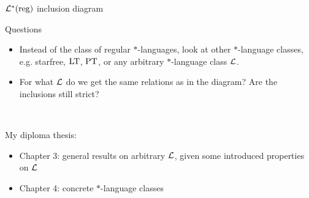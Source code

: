 \documentclass[
	notheorems,noamsthm]{beamer}
\begin{document}
\begin{frame}{$\mathcal{L}^*(\textup{\textrm{reg}})$ inclusion diagram}
\begin{center}
\end{center}
\end{frame}

\begin{frame}[<+->]{Questions}
\begin{itemize}
\item Instead of the class of regular $*$-languages, look at other $*$-language classes, e.g. starfree, $\textup{\textrm{LT}}$, $\textup{\textrm{PT}}$, or any arbitrary $*$-language class $\mathcal{L}$.
\item For what $\mathcal{L}$ do we get the same relations as in the diagram? Are the inclusions still strict?
\end{itemize}
\

My diploma thesis:
\begin{itemize}
\item Chapter 3: general results on arbitrary $\mathcal{L}$, given some introduced properties on $\mathcal{L}$
\item Chapter 4: concrete $*$-language classes
\end{itemize}
\end{frame}
\end{document}
